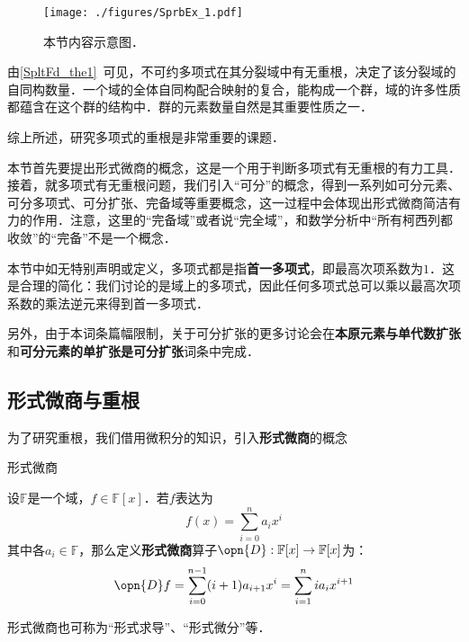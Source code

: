 



\begin{figure}[ht]
\centering
\texttt{[image: ./figures/SprbEx\_1.pdf]}
\caption{本节内容示意图．} \label{SprbEx_fig1}
\end{figure}


由\autoref{SpltFd_the1}~可见，不可约多项式在其分裂域中有无重根，决定了该分裂域的自同构数量．一个域的全体自同构配合映射的复合，能构成一个群，域的许多性质都蕴含在这个群的结构中．群的元素数量自然是其重要性质之一．

综上所述，研究多项式的重根是非常重要的课题．

本节首先要提出形式微商的概念，这是一个用于判断多项式有无重根的有力工具．接着，就多项式有无重根问题，我们引入“可分”的概念，得到一系列如可分元素、可分多项式、可分扩张、完备域等重要概念，这一过程中会体现出形式微商简洁有力的作用．注意，这里的“完备域”或者说“完全域”，和数学分析中“所有柯西列都收敛”的“完备”不是一个概念．

本节中如无特别声明或定义，多项式都是指\textbf{首一多项式}，即最高次项系数为$1$．这是合理的简化：我们讨论的是域上的多项式，因此任何多项式总可以乘以最高次项系数的乘法逆元来得到首一多项式．

另外，由于本词条篇幅限制，关于可分扩张的更多讨论会在\textbf{本原元素与单代数扩张}和\textbf{可分元素的单扩张是可分扩张}词条中完成．

\subsection{形式微商与重根}

为了研究重根，我们借用微积分的知识，引入\textbf{形式微商}的概念

\begin{definition}{形式微商}\label{SprbEx_def1}

设$\mathbb{F}$是一个域，$f\in\mathbb{F}[x]$．若$f$表达为
\begin{equation}
f(x) = \sum_{i=0}^n a_ix^i
\end{equation}
其中各$a_i\in\mathbb{F}$，那么定义\textbf{形式微商}算子$\opn{D}:\mathbb{F}[x]\to\mathbb{F}[x]$为：
\begin{equation}
\opn{D}f = \sum_{i=0}^{n-1} (i+1)a_{i+1}x^i = \sum_{i=1}^{n} ia_{i}x^{i+1}
\end{equation}

形式微商也可称为“形式求导”、“形式微分”等．

\end{definition}

